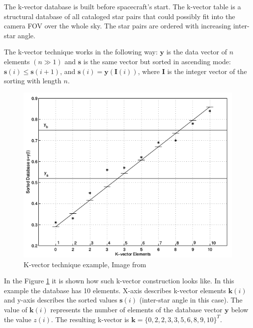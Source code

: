 \documentclass[12pt,a4paper,twoside]{article}
\begin{document}
The k-vector database is built before spacecraft's start. The k-vector table is a structural database of all cataloged star pairs that could possibly fit into the camera FOV over the whole sky. 
The star pairs are ordered with increasing inter-star angle.

The k-vector technique works in the following way: $\bm{y}$ is the data vector of $n$ elements $(n \gg 1)$ and $\bm{s}$ is the same vector but sorted in ascending mode: $\bm{s}(i) \le \bm{s}(i+1)$, and $\bm{s}(i) = \bm{y}(\bm{I}(i))$, where $\bm{I}$ is the integer vector of the sorting with length $n$\cite{mortari2013k}.


\begin{figure}[!htbp]
\includegraphics[scale=0.57]{k-vector-example.png}
\centering
\caption[K-vector technique example]{K-vector technique example, Image from \citep{mortari2000k}}
\label{fig:k-vector-example}
\end{figure}

In the Figure \ref{fig:k-vector-example} it is shown how such k-vector construction looks like. In this example the database has 10 elements. X-axis describes k-vector elements $\bm{k}(i)$ and y-axis describes the sorted values $\bm{s}(i)$ (inter-star angle in this case). The value of $\bm{k}(i)$ represents the number of elements of the database vector $\bm{y}$ below the value $z(i)$.
The resulting k-vector is $\bm{k} = \{0, 2, 2, 3, 3, 5, 6, 8, 9, 10\}^T$.
\end{document}
